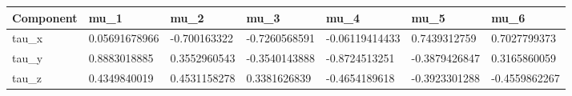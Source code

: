 \begin{tabular}{@{}lllllll@{}}
\toprule
Component & mu\_1 & mu\_2 & mu\_3 & mu\_4 & mu\_5 & mu\_6 \\
\midrule
tau\_x & 0.05691678966 & -0.700163322 & -0.7260568591 & -0.06119414433 & 0.7439312759 & 0.7027799373 \\
tau\_y & 0.8883018885 & 0.3552960543 & -0.3540143888 & -0.8724513251 & -0.3879426847 & 0.3165860059 \\
tau\_z & 0.4349840019 & 0.4531158278 & 0.3381626839 & -0.4654189618 & -0.3923301288 & -0.4559862267 \\
\bottomrule
\end{tabular}
